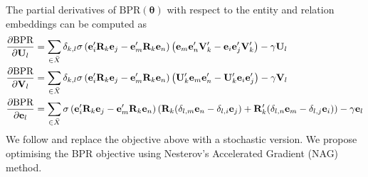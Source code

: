 \documentclass[a4paper, 11pt, fleqn]{article}
\newcommand{\btheta}[0]{\boldsymbol{\theta}}
\begin{document}
The partial derivatives of $\text{BPR}(\btheta)$ with respect to the
entity and relation embeddings can be computed as
\begin{align}
  \label{eqn:bpr_grad}
  \frac{\partial\text{BPR}}{\partial {\bf U}_l} &= \sum_{\in
    \bar{X}}\delta_{k,l}\sigma\left( {\bf e}'_i{\bf R}_k{\bf e}_j -
    {\bf e}'_m{\bf R}_k{\bf e}_n\right ) \left( {\bf e}_{m}{\bf
      e}'_{n}{\bf V}'_k-{\bf e}_{i}{\bf e}'_{j}{\bf V}'_k\right )
  - \gamma{\bf U}_l \\
  \frac{\partial\text{BPR}}{\partial {\bf V}_l} &= \sum_{\in
    \bar{X}}\delta_{k,l}\sigma\left( {\bf e}'_i{\bf R}_k{\bf e}_j -
    {\bf e}'_m{\bf R}_k{\bf e}_n\right ) \left( {\bf U}'_k{\bf
      e}_{m}{\bf e}'_{n} - {\bf U}'_k{\bf e}_{i}{\bf
      e}'_{j} \right) - \gamma{\bf V}_l \\
  \frac{\partial \text{BPR}}{\partial {\bf e}_l} &= \sum_{\in
    \bar{X}}\sigma\left( {\bf e}'_i{\bf R}_k{\bf e}_j - {\bf e}'_m{\bf
      R}_k{\bf e}_n\right ) \left( {\bf R}_{k}(\delta_{l,m} {\bf
      e}_{n} - \delta_{l,i}{\bf e}_{j}) + {\bf R}'_{k}(
    \delta_{l,n} {\bf e}_{m} - \delta_{l,j}{\bf e}_{i})
  \right) - \gamma {\bf e}_l
\end{align}
\noindent We follow \cite{rendle2009bpr} and replace the objective
above with a stochastic version. We propose optimising the BPR
objective using Nesterov's Accelerated Gradient (NAG) method.



\end{document}
